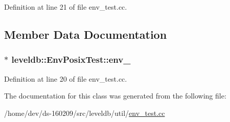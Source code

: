 Definition at line 21 of file env\+\_\+test.\+cc.



\subsection{Member Data Documentation}
\hypertarget{classleveldb_1_1_env_posix_test_a6d8ded8756fa7391e086fb31a865e639}{}
\subsubsection[{env\+\_\+}]{$\ast$ leveldb\+::\+Env\+Posix\+Test\+::env\+\_\+}\label{classleveldb_1_1_env_posix_test_a6d8ded8756fa7391e086fb31a865e639}


Definition at line 20 of file env\+\_\+test.\+cc.



The documentation for this class was generated from the following file\+:\begin{DoxyCompactItemize}
\item 
/home/dev/ds-\/160209/src/leveldb/util/\hyperlink{env__test_8cc}{env\+\_\+test.\+cc}\end{DoxyCompactItemize}
